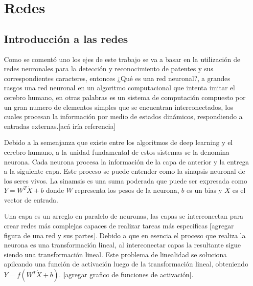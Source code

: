\section{Redes}

\subsection{Introducción a las redes}

Como se comentó uno los ejes de este trabajo se va a basar en la utilización de redes neuronales para la detección y reconocimiento de patentes y sus correspondientes caracteres, entonces ¿Qué es una red neuronal?, a grandes rasgos una red neuronal en un algoritmo computacional que intenta imitar el cerebro humano, en otras palabras es un sistema de computación compuesto por un gran numero de elementos simples que se encuentran interconectados, los cuales procesan la información por medio de estados dinámicos, respondiendo a entradas externas.[acá iría referencia]

Debido a la semenjanza que existe entre los algoritmos de deep learning y el cerebro humano, a la unidad fundamental de estos sistemas se la denomina neurona.
Cada neurona procesa la información de la capa de anterior y la entrega a la siguiente capa. Este proceso se puede entender como la sinapsis neuronal de los seres vivos.
La sinamsis es una suma poderada que puede ser expresada como $Y = W^T\dot X + b$ donde $W$ representa los pesos de la neurona, $b$ es un bias y $X$ es el vector de entrada.

Una capa es un arreglo en paralelo de neuronas, las capas se interconectan para crear redes más complejas capaces de realizar tareas más especificas [agregar figura de una red y sus partes].
Debido a que en esencia el proceso que realiza la neurona es una transformación lineal, al interconectar capas la resultante sigue siendo una transformación lineal. Este problema de linealidad se soluciona apilcando una función de activación luego de la transformación lineal, obteniendo $Y=f(W^T \dot X + b)$. [agregar grafico de funciones de activación].

